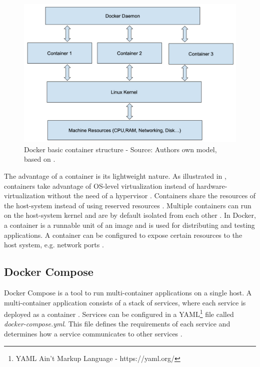 \begin{figure}[h]%
\centering
\includegraphics[scale=0.8]{images/03_background/docker_basic_container_structure}%
\caption{Docker basic container structure - Source: Authors own model, based on \cite{Bullington2020Docker}.}%
\label{fig:docker_container_struct}%
\end{figure}

The advantage of a container is its lightweight nature. As illustrated in , containers take advantage of OS-level virtualization instead of hardware-virtualization without the need of a hypervisor \cite{Docker2020Docs, Nickoloff2019Docker}. Containers share the resources of the host-system instead of using reserved resources \cite{Bullington2020Docker}. Multiple containers can run on the host-system kernel and are by default isolated from each other \cite{Docker2020Docs}.
In Docker, a container is a runnable unit of an image and is used for distributing and testing applications. A container can be configured to expose certain resources to the host system, e.g. network ports \cite{Bullington2020Docker}.


\subsection{Docker Compose}
Docker Compose is a tool to run multi-container applications on a single host. A multi-container application consists of a stack of services, where each service is deployed as a container \cite{Bullington2020Docker, Docker2020Docs}.
Services can be configured in a YAML\footnote{YAML Ain't Markup Language - https://yaml.org/} file called \textit{docker-compose.yml}. This file defines the requirements of each service and determines how a service communicates to other services \cite{Kane2018DockerUp}.


